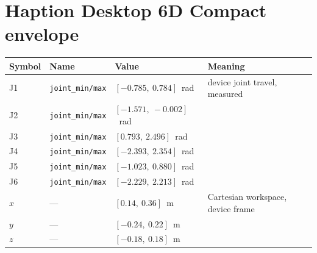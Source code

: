 \documentclass[12pt,a4paper,twoside,openright]{report}
\begin{document}
\section{Haption Desktop 6D Compact envelope}
\begin{tabularx}{\linewidth}{@{}lllX@{}}
\toprule
Symbol & Name & Value & Meaning \\
\midrule
J1 & \texttt{joint\_min/max} & $[-0.785,\ 0.784]$~rad & device joint travel, measured \\
J2 & \texttt{joint\_min/max} & $[-1.571,\ -0.002]$~rad & \\
J3 & \texttt{joint\_min/max} & $[0.793,\ 2.496]$~rad & \\
J4 & \texttt{joint\_min/max} & $[-2.393,\ 2.354]$~rad & \\
J5 & \texttt{joint\_min/max} & $[-1.023,\ 0.880]$~rad & \\
J6 & \texttt{joint\_min/max} & $[-2.229,\ 2.213]$~rad & \\
$x$ & --- & $[0.14,\ 0.36]$~m & Cartesian workspace, device frame \\
$y$ & --- & $[-0.24,\ 0.22]$~m & \\
$z$ & --- & $[-0.18,\ 0.18]$~m & \\
\bottomrule
\end{tabularx}
\end{document}
